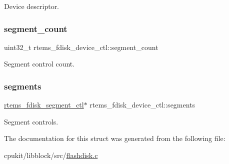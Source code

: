 Device descriptor. \mbox{\label{structrtems__fdisk__device__ctl_a68aeeb2255b4d63dd9bb8867fd597053}} 
\subsubsection{\texorpdfstring{segment\_count}{segment\_count}}
{\footnotesize\ttfamily uint32\+\_\+t rtems\+\_\+fdisk\+\_\+device\+\_\+ctl\+::segment\+\_\+count}

Segment control count. \mbox{\label{structrtems__fdisk__device__ctl_aaafa94fb922fde1ec6343f8e07c23720}} 
\subsubsection{\texorpdfstring{segments}{segments}}
{\footnotesize\ttfamily \mbox{\hyperlink{structrtems__fdisk__segment__ctl}{rtems\+\_\+fdisk\+\_\+segment\+\_\+ctl}}$\ast$ rtems\+\_\+fdisk\+\_\+device\+\_\+ctl\+::segments}

Segment controls. 

The documentation for this struct was generated from the following file\+:\begin{DoxyCompactItemize}
\item 
cpukit/libblock/src/\mbox{\hyperlink{flashdisk_8c}{flashdisk.\+c}}\end{DoxyCompactItemize}
